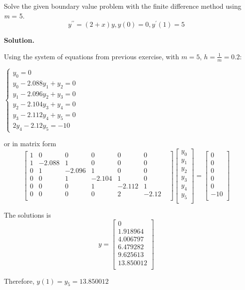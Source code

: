 \begin{exercise}{4} %
Solve the given boundary value problem with the finite difference
method using \textit{m} = 5.
$$y^{\prime\prime} = (2 + x)y, y(0) = 0, y^\prime(1) = 5$$

\textbf{Solution.}

Using the system of equations from previous exercise, with $m=5$, $h =\frac{1}{m}=0.2$:
\begin{center}
    $\begin{cases} 
    y_0 =0 \\ 
    y_0 - 2.088y_1 + y_2 = 0 \\ 
    y_1 - 2.096y_2 + y_3 = 0 \\ 
    y_2 - 2.104y_3 + y_4 = 0 \\ 
    y_3 - 2.112y_4 + y_5 = 0 \\ 
    2y_4 - 2.12y_5 = -10
    \end{cases}$
\end{center}

or in matrix form
$$
 \begin{bmatrix} 
 1 & 0 & 0 & 0 & 0 & 0 \\ 
 1 & -2.088 & 1 & 0 & 0 & 0 \\ 
 0 & 1 & -2.096 & 1 & 0 & 0 \\ 
 0 & 0 & 1 & -2.104 & 1 & 0 \\ 
 0 & 0 & 0 & 1 & -2.112 & 1 \\ 
 0 & 0 & 0 & 0 & 2 & -2.12 & \\ 
 \end{bmatrix}
 \begin{bmatrix} 
 y_0 \\
 y_1 \\
 y_2 \\
 y_3 \\
 y_4 \\
 y_5 \\
 \end{bmatrix}
 = 
 \begin{bmatrix} 
 0 \\
 0 \\
 0 \\
 0 \\
 0 \\
 -10 \\
 \end{bmatrix}
$$

The solutions is
$$
y = 
 \begin{bmatrix} 
 0 \\
 1.918964 \\
 4.006797 \\
 6.479282 \\
 9.625613 \\
 13.850012 \\
 \end{bmatrix}
$$

Therefore, $y(1)=y_5 = 13.850012$
\end{exercise}


